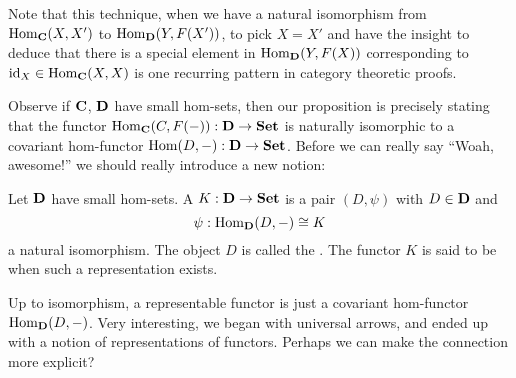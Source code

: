 Note that this technique, when we have a natural isomorphism from
$\operatorname{Hom}_{\mathbf{C}}(X,X')$ to $\operatorname{Hom}_{\mathbf{D}}(Y,F(X'))$, to pick $X=X'$
and have the insight to deduce that there is a special element in
$\operatorname{Hom}_{\mathbf{D}}(Y,F(X))$ corresponding to
$\operatorname{id}_{X}\in\operatorname{Hom}_{\mathbf{C}}(X,X)$ is one recurring pattern in
category theoretic proofs.

Observe if $\mathbf{C}$, $\mathbf{D}$ have small hom-sets, then our
proposition is precisely stating that the functor
$\operatorname{Hom}_{\mathbf{C}}(C,F(-)):\mathbf{D}\to\mathbf{Set}$ is naturally isomorphic
to a covariant hom-functor
$\operatorname{Hom}(D,-):\mathbf{D}\to{}\mathbf{Set}$. Before we can really say ``Woah,
awesome!'' we should really introduce a new notion:

\begin{defn}%
Let $\mathbf{D}$ have small hom-sets. A  
$K:\mathbf{D}\to\mathbf{Set}$ is a pair $(D,\psi)$ with $D\in\mathbf{D}$ and
\begin{equation}%
\psi:\hom_{\ms{D}}(D,-)\cong{}K
\end{equation}
a natural isomorphism. The object $D$ is called the
. The functor $K$ is said to be
 when such a representation exists.
\end{defn}

Up to isomorphism, a representable functor is just a covariant
hom-functor $\operatorname{Hom}_{\mathbf{D}}(D,-)$. Very interesting, we began with
universal arrows, and ended up with a notion of representations
of functors. Perhaps we can make the connection more explicit?

